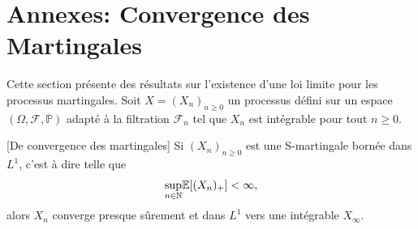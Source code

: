 \section{Annexes: Convergence des Martingales}\label{app:convergence_martingale}
Cette section présente des résultats sur l'existence d'une loi limite pour les processus martingales. Soit $X=(X_n)_{n\geq 0}$ un processus défini sur un espace $(\Omega, \mathcal{F},\mathbb{P})$ adapté à la filtration $\mathcal{F}_n$ tel que $X_n$ est intégrable pour tout $n\geq 0$.
\begin{theo}\label{theo:convergence_ps_martingale}[De convergence des martingales]
Si $(X_n)_{n\geq0}$ est une S-martingale bornée dans $L^1$, c'est à dire telle que 
$$
\underset{n\in\mathbb{N}}{\sup}\mathbb{E}[(X_n)_+]<\infty,
$$ 
alors $X_n$ converge presque sûrement et dans $L^1$ vers une \va intégrable $X_\infty$.

\end{theo}
